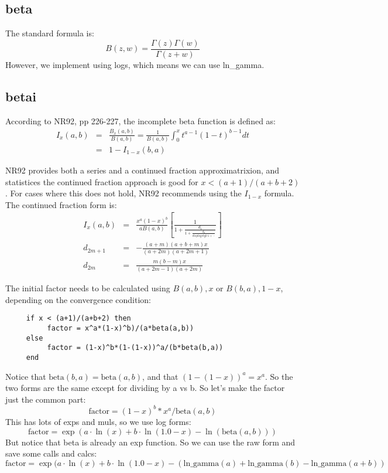 \subsection*{beta}
The standard formula is:
\begin{equation}
  B(z,w) = \frac{\Gamma(z) \Gamma(w)}{\Gamma(z+w)}
\end{equation}
However, we implement using logs, which means we can use ln\_gamma.

\subsection*{betai}
According to NR92, pp 226-227,
the incomplete beta function is defined as:
\begin{eqnarray}
    I_x(a,b) & = & \frac{B_x(a,b)}{B(a,b)}
               = \frac{1}{B(a,b)}\int_0^xt^{a-1}(1-t)^{b-1}dt\\
             & = & 1 - I_{1-x}(b,a)
\end{eqnarray}

NR92 provides both a series and a continued fraction approximatrixion,
and statistices the continued fraction approach is good for
$x < (a+1)/(a+b+2)$.  For cases where this does not hold, NR92
recommends using the $I_{1-x}$ formula.  The continued fraction
form is:
\begin{eqnarray}
  I_x(a,b) & = & \frac{x^a(1-x)^b}{aB(a,b)}
                 \left[ \frac{1}{\displaystyle 1
                        + \frac{d_1} {\displaystyle 1
                          + \frac{d_2} {displaystyle 1
                            + \cdots}}} \right]\\
  d_{2m+1} & = & -\frac{(a+m)(a+b+m)x} {(a+2m)(a+2m+1)}\\
  d_{2m}   & = & \frac{m(b-m)x}{(a+2m-1)(a+2m)}
\end{eqnarray}
  
The initial factor needs to be
calculated using $B(a,b),x$ or $B(b,a),1-x$, depending on the convergence
condition:
\begin{verbatim}
     if x < (a+1)/(a+b+2) then
          factor = x^a*(1-x)^b)/(a*beta(a,b))
     else
          factor = (1-x)^b*(1-(1-x))^a/(b*beta(b,a))
     end
\end{verbatim}

Notice that $\mbox{beta}(b,a)=\mbox{beta}(a,b)$, 
and that $(1-(1-x))^a = x^a$.
So the two forms are the same except for dividing by a vs b.
So let's make the factor just the common part:
\begin{equation}
  \mbox{factor} = (1-x)^b*x^a/\mbox{beta}(a,b)
\end{equation}
This has lots of exps and muls, so we use log forms:
\begin{equation}
  \mbox{factor} = \exp(a \cdot \ln(x)+b \cdot \ln(1.0-x)
      -\ln(\mbox{beta}(a,b)))
\end{equation}
But notice that beta is already an exp function.  So we can
use the raw form and save some calls and calcs:
\begin{equation}
  \mbox{factor} = \exp(a \cdot \ln(x) + b \cdot \ln(1.0-x)
          -(\mbox{ln\_gamma}(a)+\mbox{ln\_gamma}(b)-\mbox{ln\_gamma}(a+b))
\end{equation}


